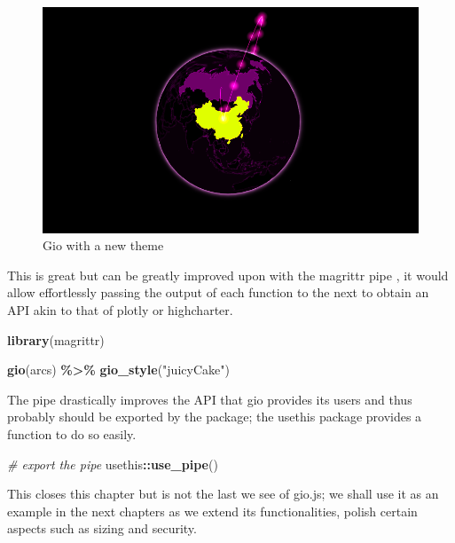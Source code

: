 \documentclass[
]{krantz}
\makeatletter
\newenvironment{Shaded}{\begin{snugshade}}{\end{snugshade}}
\newcommand{\CommentTok}[1]{\textcolor[rgb]{0.37,0.37,0.37}{\textit{#1}}}
\newcommand{\KeywordTok}[1]{\textcolor[rgb]{0.27,0.27,0.27}{\textbf{#1}}}
\newcommand{\NormalTok}[1]{#1}
\newcommand{\OperatorTok}[1]{\textcolor[rgb]{0.43,0.43,0.43}{\textbf{#1}}}
\newcommand{\StringTok}[1]{\textcolor[rgb]{0.5,0.5,0.5}{#1}}
\newenvironment{kframe}{%
\medskip{}
\setlength{\fboxsep}{.8em}
 \def\at@end@of@kframe{}%
 \ifinner\ifhmode%
  \def\at@end@of@kframe{\end{minipage}}%
  \begin{minipage}{\columnwidth}%
 \fi\fi%
 \def\FrameCommand##1{\hskip\@totalleftmargin \hskip-\fboxsep
 \colorbox{shadecolor}{##1}\hskip-\fboxsep
     \hskip-\linewidth \hskip-\@totalleftmargin \hskip\columnwidth}%
 \MakeFramed {\advance\hsize-\width
   \@totalleftmargin\z@ \linewidth\hsize
   \@setminipage}}%
 {\par\unskip\endMakeFramed%
 \at@end@of@kframe}
\renewenvironment{Shaded}{\begin{kframe}}{\end{kframe}}
\makeatother
\begin{document}
\begin{figure}[t]

{\centering \includegraphics[width=1\linewidth]{images/gio-style} 

}

\caption{Gio with a new theme}\label{fig:gio-style}
\end{figure}

This is great but can be greatly improved upon with the magrittr pipe \citep{R-magrittr}, it would allow effortlessly passing the output of each function to the next to obtain an API akin to that of plotly or highcharter.

\begin{Shaded}
\begin{Highlighting}[]
\KeywordTok{library}\NormalTok{(magrittr)}

\KeywordTok{gio}\NormalTok{(arcs) }\OperatorTok{\%>\%}\StringTok{ }
\StringTok{  }\KeywordTok{gio\_style}\NormalTok{(}\StringTok{"juicyCake"}\NormalTok{)}
\end{Highlighting}
\end{Shaded}

The pipe drastically improves the API that gio provides its users and thus probably should be exported by the package; the usethis package provides a function to do so easily.

\begin{Shaded}
\begin{Highlighting}[]
\CommentTok{\# export the pipe}
\NormalTok{usethis}\OperatorTok{::}\KeywordTok{use\_pipe}\NormalTok{()}
\end{Highlighting}
\end{Shaded}

This closes this chapter but is not the last we see of gio.js; we shall use it as an example in the next chapters as we extend its functionalities, polish certain aspects such as sizing and security.
\end{document}

